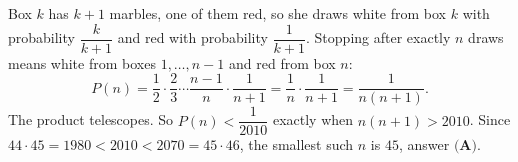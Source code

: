 Box $k$ has $k+1$ marbles, one of them red, so she draws white from box $k$ with probability $\dfrac{k}{k+1}$ and red with probability $\dfrac{1}{k+1}$. Stopping after exactly $n$ draws means white from boxes $1,\dots,n-1$ and red from box $n$:
\[
P(n)=\dfrac{1}{2}\cdot\dfrac{2}{3}\cdots\dfrac{n-1}{n}\cdot\dfrac{1}{n+1}=\dfrac{1}{n}\cdot\dfrac{1}{n+1}=\dfrac{1}{n(n+1)} .
\]
The product telescopes. So $P(n)<\dfrac{1}{2010}$ exactly when $n(n+1)>2010$. Since $44\cdot45=1980<2010<2070=45\cdot46$, the smallest such $n$ is $\boxed{45}$, answer $\textbf{(A)}$.
